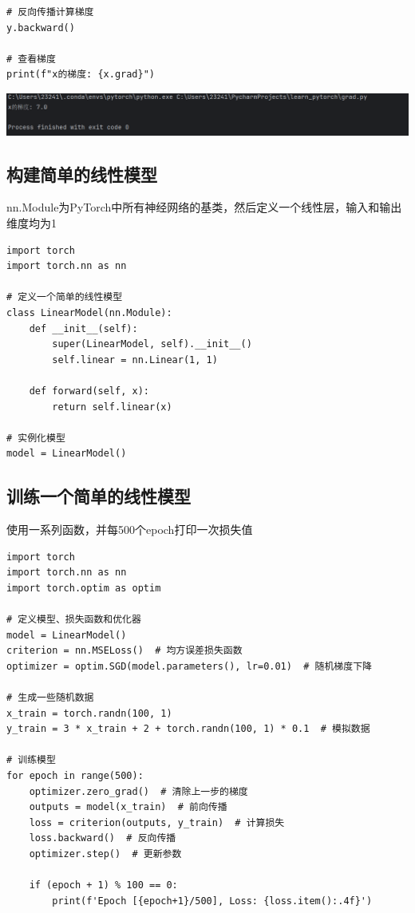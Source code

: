 \documentclass[UTF8,a4paper]{ctexart}
\begin{document}
\begin{sloppypar}
\begin{lstlisting}
# 反向传播计算梯度
y.backward()

# 查看梯度
print(f"x的梯度: {x.grad}")
    \end{lstlisting}
	
	\includegraphics[width = 16cm]{11}
	
	
	\subsection{构建简单的线性模型}
	nn.Module为PyTorch中所有神经网络的基类，然后定义一个线性层，输入和输出维度均为1
\begin{lstlisting}
import torch
import torch.nn as nn

# 定义一个简单的线性模型
class LinearModel(nn.Module):
    def __init__(self):
        super(LinearModel, self).__init__()
        self.linear = nn.Linear(1, 1)

    def forward(self, x):
        return self.linear(x)

# 实例化模型
model = LinearModel()

\end{lstlisting}
	
	
	\subsection{训练一个简单的线性模型}
	使用一系列函数，并每500个epoch打印一次损失值
	\begin{lstlisting}
import torch
import torch.nn as nn
import torch.optim as optim

# 定义模型、损失函数和优化器
model = LinearModel()
criterion = nn.MSELoss()  # 均方误差损失函数
optimizer = optim.SGD(model.parameters(), lr=0.01)  # 随机梯度下降

# 生成一些随机数据
x_train = torch.randn(100, 1)
y_train = 3 * x_train + 2 + torch.randn(100, 1) * 0.1  # 模拟数据

# 训练模型
for epoch in range(500):
    optimizer.zero_grad()  # 清除上一步的梯度
    outputs = model(x_train)  # 前向传播
    loss = criterion(outputs, y_train)  # 计算损失
    loss.backward()  # 反向传播
    optimizer.step()  # 更新参数

    if (epoch + 1) % 100 == 0:
        print(f'Epoch [{epoch+1}/500], Loss: {loss.item():.4f}')
	\end{lstlisting}
	

\end{sloppypar}
\end{document}
